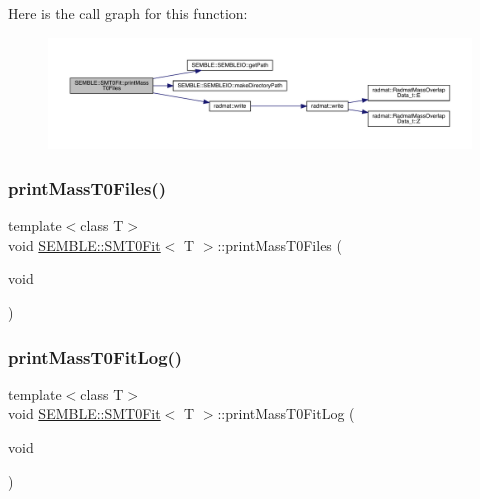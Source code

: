 Here is the call graph for this function\+:
\nopagebreak
\begin{figure}[H]
\begin{center}
\leavevmode
\includegraphics[width=350pt]{d6/dad/structSEMBLE_1_1SMT0Fit_a4143346724c18fdd7e82f34f585ed11d_cgraph}
\end{center}
\end{figure}
\mbox{\label{structSEMBLE_1_1SMT0Fit_a4143346724c18fdd7e82f34f585ed11d}} 
\subsubsection{\texorpdfstring{printMassT0Files()}{printMassT0Files()}\hspace{0.1cm}{\footnotesize\ttfamily [2/2]}}
{\footnotesize\ttfamily template$<$class T$>$ \\
void \mbox{\hyperlink{structSEMBLE_1_1SMT0Fit}{S\+E\+M\+B\+L\+E\+::\+S\+M\+T0\+Fit}}$<$ T $>$\+::print\+Mass\+T0\+Files (\begin{DoxyParamCaption}\item[{void}]{ }\end{DoxyParamCaption})}

\mbox{\label{structSEMBLE_1_1SMT0Fit_acfb1bcb9dbae9eb752ca05769ab0caa4}} 
\subsubsection{\texorpdfstring{printMassT0FitLog()}{printMassT0FitLog()}\hspace{0.1cm}{\footnotesize\ttfamily [1/2]}}
{\footnotesize\ttfamily template$<$class T$>$ \\
void \mbox{\hyperlink{structSEMBLE_1_1SMT0Fit}{S\+E\+M\+B\+L\+E\+::\+S\+M\+T0\+Fit}}$<$ T $>$\+::print\+Mass\+T0\+Fit\+Log (\begin{DoxyParamCaption}\item[{void}]{ }\end{DoxyParamCaption})}


